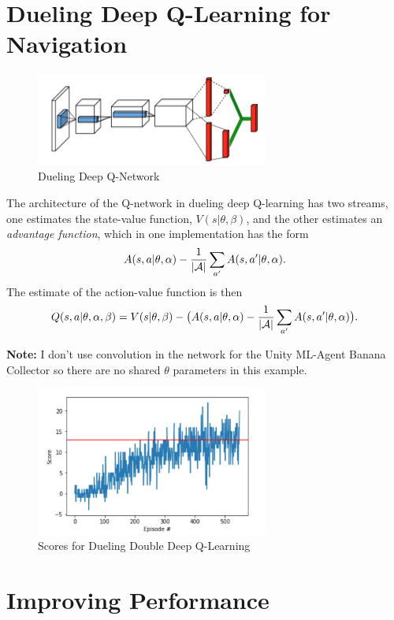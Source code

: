 \documentclass[tog]{acmsiggraph}
\begin{document}
\section{ Dueling Deep Q-Learning for Navigation}

\begin{figure}[h]
	\centering
	\includegraphics[width=3.0in]{images/dueling-dqn}
	\caption{Dueling Deep Q-Network~\protect\cite{DBLP:journals/corr/WangFL15}}
	\label{fig:ferrari}
\end{figure}

The architecture of the Q-network in dueling deep Q-learning has two streams, one estimates the state-value function, $V(s|\theta, \beta)$, and the other estimates an {\em advantage function},
which in one implementation has the form
$$A(s,a|\theta, \alpha) - \frac{1}{{\cal |A|}}\sum_{a'}A(s, a'|\theta, \alpha).$$
The estimate of the action-value function is then
$$Q(s,a|\theta, \alpha, \beta) = V(s|\theta, \beta) - \big(A(s,a|\theta, \alpha) - \frac{1}{{\cal |A|}}\sum_{a'}A(s, a'|\theta, \alpha)\big).$$

{\bf Note:} I don't use convolution in the network for the Unity ML-Agent Banana Collector so there are no shared $\theta$ parameters in this example.

\begin{figure}[h]
	\centering
	\includegraphics[width=3.0in]{images/dueling-dqn-scores}
	\caption{Scores for Dueling Double  Deep Q-Learning}
	\label{fig:ferrari}
\end{figure}


\section{Improving Performance}






%

\end{document}
